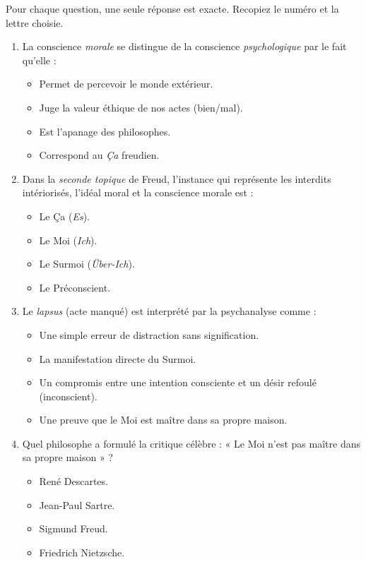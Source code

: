 \documentclass[11pt]{article}
\begin{document}
\begin{exercice}
Pour chaque question, une seule réponse est exacte. Recopiez le numéro et la lettre choisie.
\begin{enumerate}
    \item La conscience \emph{morale} se distingue de la conscience \emph{psychologique} par le fait qu'elle :
    \begin{itemize}
        \item[A.] Permet de percevoir le monde extérieur.
        \item[B.] Juge la valeur éthique de nos actes (bien/mal).
        \item[C.] Est l'apanage des philosophes.
        \item[D.] Correspond au \emph{Ça} freudien.
    \end{itemize}
    \item Dans la \emph{seconde topique} de Freud, l'instance qui représente les interdits intériorisés, l'idéal moral et la conscience morale est :
    \begin{itemize}
        \item[A.] Le Ça (\emph{Es}).
        \item[B.] Le Moi (\emph{Ich}).
        \item[C.] Le Surmoi (\emph{Über-Ich}).
        \item[D.] Le Préconscient.
    \end{itemize}
    \item Le \emph{lapsus} (acte manqué) est interprété par la psychanalyse comme :
    \begin{itemize}
        \item[A.] Une simple erreur de distraction sans signification.
        \item[B.] La manifestation directe du Surmoi.
        \item[C.] Un compromis entre une intention consciente et un désir refoulé (inconscient).
        \item[D.] Une preuve que le Moi est maître dans sa propre maison.
    \end{itemize}
    \item Quel philosophe a formulé la critique célèbre : « Le Moi n'est pas maître dans sa propre maison » ?
    \begin{itemize}
        \item[A.] René Descartes.
        \item[B.] Jean-Paul Sartre.
        \item[C.] Sigmund Freud.
        \item[D.] Friedrich Nietzsche.
    \end{itemize}
\end{enumerate}
\end{exercice}
\end{document}
